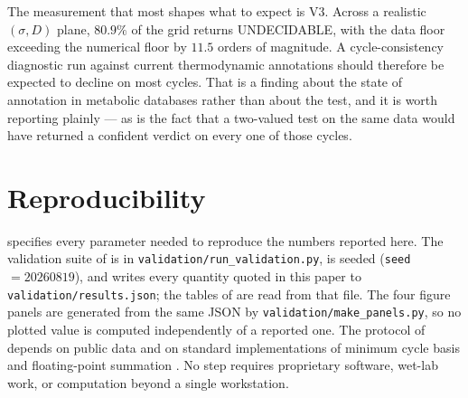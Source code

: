 \documentclass[11pt,twocolumn,a4paper]{article}
\theoremstyle{pstyle}
\theoremstyle{definition}
\theoremstyle{remark}
\begin{document}
The measurement that most shapes what to expect is V3. Across a
realistic $(\sigma,D)$ plane, $80.9\%$ of the grid returns
\textsf{UNDECIDABLE}, with the data floor exceeding the numerical floor
by $11.5$ orders of magnitude. A cycle-consistency diagnostic run
against current thermodynamic annotations should therefore be expected
to decline on most cycles. That is a finding about the state of
annotation in metabolic databases rather than about the test, and it is
worth reporting plainly --- as is the fact that a two-valued test on the
same data would have returned a confident verdict on every one of those
cycles.

\section*{Reproducibility}

 specifies every parameter needed to reproduce the
numbers reported here. The validation suite of  is
in \texttt{validation/run\_validation.py}, is seeded
(\texttt{seed}~$=20260819$), and writes every quantity quoted in this
paper to \texttt{validation/results.json}; the tables of
 are read from that file.
The four figure panels are generated from the same JSON by
\texttt{validation/make\_panels.py}, so no plotted value is computed
independently of a reported one. The protocol of
 depends on public data
\citep{brunk2018,noor2013,flamholz2012,rapoport1975,mulquiney1999} and
on standard implementations of minimum cycle basis
\citep{horton1987,hagberg2008} and floating-point summation
\citep{kahan1965}. No step requires proprietary software, wet-lab work,
or computation beyond a single workstation.



\end{document}
